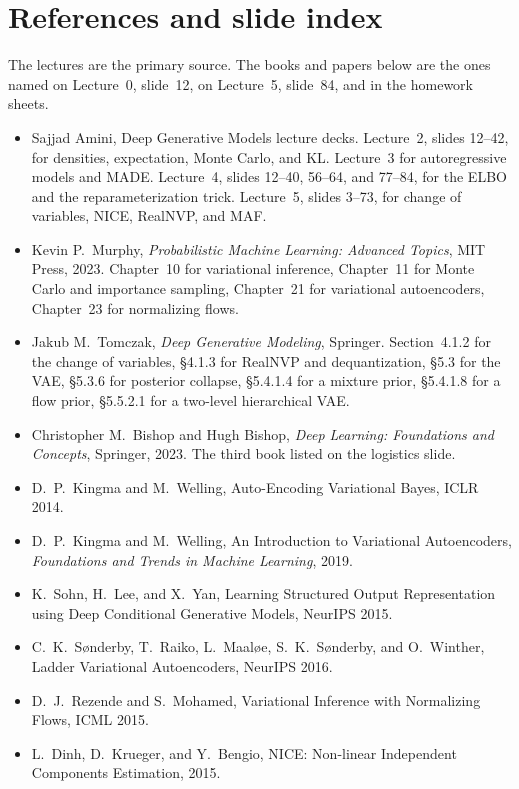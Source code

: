 \chapter*{References and slide index}

The lectures are the primary source. The books and papers below are the ones named on Lecture~0, slide~12, on Lecture~5, slide~84, and in the homework sheets.

\begin{itemize}[leftmargin=1.2em]
\item Sajjad Amini, Deep Generative Models lecture decks. Lecture~2, slides 12--42, for densities, expectation, Monte Carlo, and KL. Lecture~3 for autoregressive models and MADE. Lecture~4, slides 12--40, 56--64, and 77--84, for the ELBO and the reparameterization trick. Lecture~5, slides 3--73, for change of variables, NICE, RealNVP, and MAF.
\item Kevin P.\ Murphy, \emph{Probabilistic Machine Learning: Advanced Topics}, MIT Press, 2023. Chapter~10 for variational inference, Chapter~11 for Monte Carlo and importance sampling, Chapter~21 for variational autoencoders, Chapter~23 for normalizing flows.
\item Jakub M.\ Tomczak, \emph{Deep Generative Modeling}, Springer. Section~4.1.2 for the change of variables, \S4.1.3 for RealNVP and dequantization, \S5.3 for the VAE, \S5.3.6 for posterior collapse, \S5.4.1.4 for a mixture prior, \S5.4.1.8 for a flow prior, \S5.5.2.1 for a two-level hierarchical VAE.
\item Christopher M.\ Bishop and Hugh Bishop, \emph{Deep Learning: Foundations and Concepts}, Springer, 2023. The third book listed on the logistics slide.
\item D.\ P.\ Kingma and M.\ Welling, Auto-Encoding Variational Bayes, ICLR 2014.
\item D.\ P.\ Kingma and M.\ Welling, An Introduction to Variational Autoencoders, \emph{Foundations and Trends in Machine Learning}, 2019.
\item K.\ Sohn, H.\ Lee, and X.\ Yan, Learning Structured Output Representation using Deep Conditional Generative Models, NeurIPS 2015.
\item C.\ K.\ S{\o}nderby, T.\ Raiko, L.\ Maal{\o}e, S.\ K.\ S{\o}nderby, and O.\ Winther, Ladder Variational Autoencoders, NeurIPS 2016.
\item D.\ J.\ Rezende and S.\ Mohamed, Variational Inference with Normalizing Flows, ICML 2015.
\item L.\ Dinh, D.\ Krueger, and Y.\ Bengio, NICE: Non-linear Independent Components Estimation, 2015.

\end{itemize}

